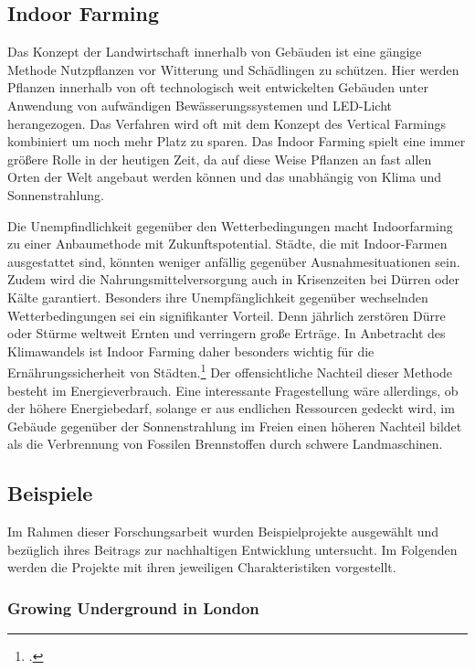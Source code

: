 \documentclass{scrartcl}
\begin{document}
\subsection{Indoor Farming}

Das Konzept der Landwirtschaft innerhalb von Gebäuden ist eine gängige Methode Nutzpflanzen vor Witterung und Schädlingen zu schützen. Hier werden Pflanzen innerhalb von oft technologisch weit entwickelten Gebäuden unter Anwendung von aufwändigen Bewässerungssystemen und LED-Licht herangezogen. Das Verfahren wird oft mit dem Konzept des Vertical Farmings kombiniert um noch mehr Platz zu sparen. Das Indoor Farming spielt eine immer größere Rolle in der heutigen Zeit, da auf diese Weise Pflanzen an fast allen Orten der Welt angebaut werden können und das unabhängig von Klima und Sonnenstrahlung.

Die Unempfindlichkeit gegenüber den Wetterbedingungen macht Indoorfarming zu einer Anbaumethode mit Zukunftspotential. Städte, die mit Indoor-Farmen ausgestattet sind, könnten weniger anfällig gegenüber Ausnahmesituationen sein. Zudem wird die Nahrungsmittelversorgung auch in Krisenzeiten bei Dürren oder Kälte garantiert. Besonders ihre Unempfänglichkeit gegenüber wechselnden Wetterbedingungen sei ein signifikanter Vorteil. Denn jährlich zerstören Dürre oder Stürme weltweit Ernten und verringern große Erträge. In Anbetracht des Klimawandels ist Indoor Farming daher besonders wichtig für die Ernährungssicherheit von Städten.\footcite[Vgl.][S.27]{Al-Kodmany2018TheCity} Der offensichtliche Nachteil dieser Methode besteht im Energieverbrauch. Eine interessante Fragestellung wäre allerdings, ob der höhere Energiebedarf, solange er aus endlichen Ressourcen gedeckt wird, im Gebäude gegenüber der Sonnenstrahlung im Freien einen höheren Nachteil bildet als die Verbrennung von Fossilen Brennstoffen durch schwere Landmaschinen. 

\subsection{Beispiele}

Im Rahmen dieser Forschungsarbeit wurden Beispielprojekte ausgewählt und bezüglich ihres Beitrags zur nachhaltigen Entwicklung untersucht. Im Folgenden werden die Projekte mit ihren jeweiligen Charakteristiken vorgestellt.

\subsubsection{Growing Underground in London}
\end{document}
